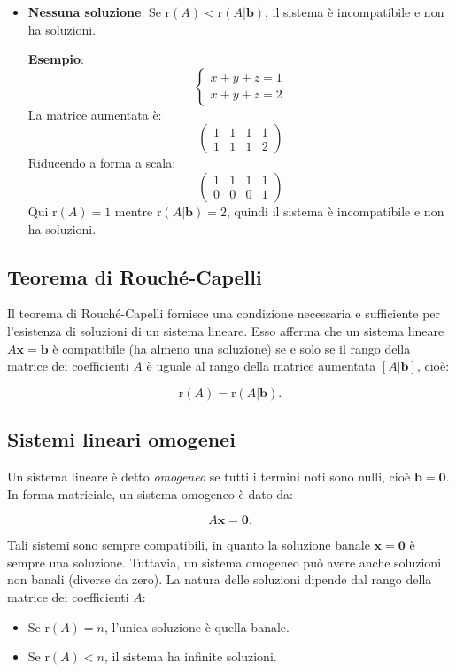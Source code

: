 \documentclass{article}
\begin{document}
\begin{itemize}
	\item \textbf{Nessuna soluzione}: Se \( \text{r}(A) < \text{r}(A | \mathbf{b}) \), il sistema è incompatibile e non ha soluzioni.

	      \textbf{Esempio}:
	      \[
		      \begin{cases}
			      x + y + z = 1 \\
			      x + y + z = 2
		      \end{cases}
	      \]
	      La matrice aumentata è:
	      \[
		      \left( \begin{array}{ccc|c}
				      1 & 1 & 1 & 1 \\
				      1 & 1 & 1 & 2
			      \end{array} \right)
	      \]
	      Riducendo a forma a scala:
	      \[
		      \left( \begin{array}{ccc|c}
				      1 & 1 & 1 & 1 \\
				      0 & 0 & 0 & 1
			      \end{array} \right)
	      \]
	      Qui \( \text{r}(A) = 1 \) mentre \( \text{r}(A | \mathbf{b}) = 2 \), quindi il
	      sistema è incompatibile e non ha soluzioni.
\end{itemize}

\subsection{Teorema di Rouché-Capelli}

Il teorema di Rouché-Capelli fornisce una condizione necessaria e sufficiente
per l'esistenza di soluzioni di un sistema lineare. Esso afferma che un sistema
lineare \( A \mathbf{x} = \mathbf{b} \) è compatibile (ha almeno una soluzione)
se e solo se il rango della matrice dei coefficienti \( A \) è uguale al rango
della matrice aumentata \( [A | \mathbf{b}] \), cioè:

\[
	\text{r}(A) = \text{r}(A | \mathbf{b}).
\]

\subsection{Sistemi lineari omogenei}

Un sistema lineare è detto \emph{omogeneo} se tutti i termini noti sono nulli,
cioè \( \mathbf{b} = \mathbf{0} \). In forma matriciale, un sistema omogeneo è
dato da:

\[
	A \mathbf{x} = \mathbf{0}.
\]

Tali sistemi sono sempre compatibili, in quanto la soluzione banale \(
\mathbf{x} = \mathbf{0} \) è sempre una soluzione. Tuttavia, un sistema
omogeneo può avere anche soluzioni non banali (diverse da zero). La natura
delle soluzioni dipende dal rango della matrice dei coefficienti \( A \):
\begin{itemize}
	\item Se \( \text{r}(A) = n \), l'unica soluzione è quella banale.
	\item Se \( \text{r}(A) < n \), il sistema ha infinite soluzioni.
\end{itemize}
\end{document}
